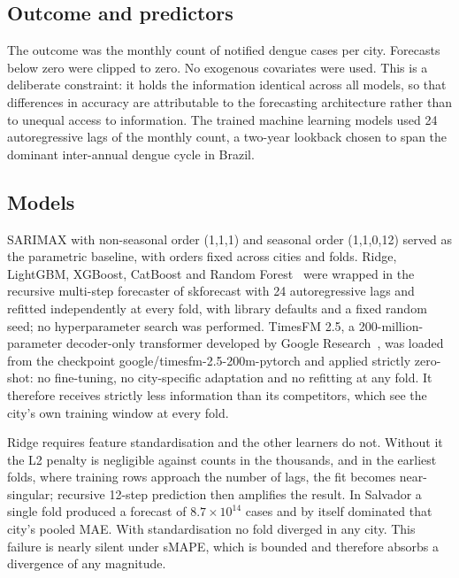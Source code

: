\documentclass[10pt,letterpaper]{article}
\begin{document}
\subsection*{Outcome and predictors}

The outcome was the monthly count of notified dengue cases per city. Forecasts below zero were clipped to zero. No exogenous covariates were used. This is a deliberate constraint: it holds the information identical across all models, so that differences in accuracy are attributable to the forecasting architecture rather than to unequal access to information. The trained machine learning models used 24 autoregressive lags of the monthly count, a two-year lookback chosen to span the dominant inter-annual dengue cycle in Brazil.

\subsection*{Models}

SARIMAX with non-seasonal order (1,1,1) and seasonal order (1,1,0,12) served as the parametric baseline, with orders fixed across cities and folds. Ridge, LightGBM, XGBoost, CatBoost and Random Forest~\cite{Ke2017lightgbm,Chen2016xgboost,Prokhorenkova2018catboost,Breiman2001} were wrapped in the recursive multi-step forecaster of skforecast with 24 autoregressive lags and refitted independently at every fold, with library defaults and a fixed random seed; no hyperparameter search was performed. TimesFM 2.5, a 200-million-parameter decoder-only transformer developed by Google Research~\cite{Das2024timesfm}, was loaded from the checkpoint google/timesfm-2.5-200m-pytorch and applied strictly zero-shot: no fine-tuning, no city-specific adaptation and no refitting at any fold. It therefore receives strictly less information than its competitors, which see the city's own training window at every fold.

Ridge requires feature standardisation and the other learners do not. Without it the L2 penalty is negligible against counts in the thousands, and in the earliest folds, where training rows approach the number of lags, the fit becomes near-singular; recursive 12-step prediction then amplifies the result. In Salvador a single fold produced a forecast of $8.7 \times 10^{14}$ cases and by itself dominated that city's pooled MAE. With standardisation no fold diverged in any city. This failure is nearly silent under sMAPE, which is bounded and therefore absorbs a divergence of any magnitude.
\end{document}
